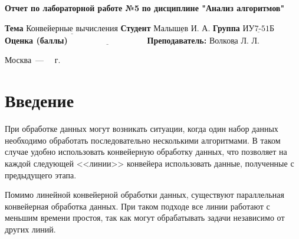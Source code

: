 \documentclass[12pt]{report}
\begin{document}
\begin{titlepage}
	
	\begin{center}
		\noindent\begin{minipage}{1.3\textwidth}\centering
			\Large\textbf{Отчет по лабораторной работе №5}\newline
			\textbf{по дисциплине "Анализ алгоритмов"}\newline\newline
		\end{minipage}
	\end{center}
	
	\noindent\textbf{Тема} $\underline{\text{Конвейерные вычисления}}$\newline\newline
	\noindent\textbf{Студент} $\underline{\text{Малышев И. А.}}$\newline\newline
	\noindent\textbf{Группа} $\underline{\text{ИУ7-51Б}}$\newline\newline
	\noindent\textbf{Оценка (баллы)} $\underline{\text{~~~~~~~~~~~~~~~~~~~~~~~~~~~}}$\newline\newline
	\noindent\textbf{Преподаватель: } $\underline{\text{Волкова Л. Л.}}$\newline\newline\newline
	
	\begin{center}
		\vfill
		Москва~---~\the\year
		~г.
	\end{center}
\end{titlepage}

\newpage
\renewcommand{\contentsname}{Содержание}
\setcounter{page}{2}
\tableofcontents

\newpage
\chapter*{Введение}

При обработке данных могут возникать ситуации, когда один набор данных необходимо обработать последовательно несколькими алгоритмами. В таком случае удобно использовать конвейерную обработку данных, что позволяет на каждой следующей <<линии>> конвейера использовать данные, полученные с предыдущего этапа. 

Помимо линейной конвейерной обработки данных, существуют параллельная конвейерная обработка данных. При таком подходе все линии работают с меньшим времени простоя, так как могут обрабатывать задачи независимо от других линий.
\end{document}
